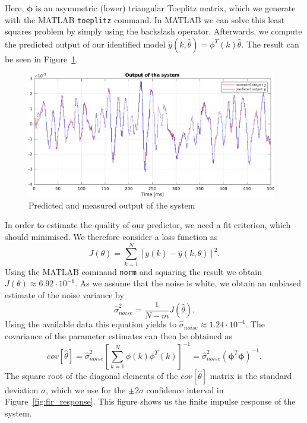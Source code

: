 Here, $\pmb{\phi}$ is an asymmetric (lower) triangular Toeplitz matrix, which we generate with the MATLAB \texttt{toeplitz} command.
In MATLAB we can solve this least squares problem by simply using the backslash operator. 
Afterwards, we compute the predicted output of our identified model $\hat{y} (k,\hat{\theta}) = \phi^{T} (k) \hat{\theta}$. The result can be seen in Figure~\ref{fig:output_fir}.
\begin{figure}[h]
	\centering
	\includegraphics[height=5.5cm]{figures/output.pdf}
	\caption{Predicted and measured output of the system}\label{fig:output_fir}
\end{figure}
In order to estimate the quality of our predictor, we need a fit criterion, which should minimised. We therefore consider a loss function as 
\begin{equation}\label{eq:J}
	J(\theta) = \sum\limits_{k=1}^N \left[y(k) - \hat{y}(k,\theta) \right]^2.
\end{equation}
Using the MATLAB command \texttt{norm} and squaring the result we obtain $ J(\theta) \approx 6.92 \cdot 10^{-6}$. 
As we assume that the noise is white, we obtain an unbiased estimate of the noise variance by
\begin{equation}\label{eq:sigma}
	\hat{\sigma}_{noise}^{2} = \frac{1}{N-m} J(\hat{\theta}) .
\end{equation}
Using the available data this equation yields to $ \hat{\sigma}_{noise} \approx 1.24 \cdot 10^{-4} $.
The covariance of the parameter estimates can then be obtained as
\begin{equation}\label{eq:cov}
	cov[\hat{\theta}] = \hat{\sigma}_{noise}^2 \left[ \sum\limits_{k=1}^N \phi(k)\phi^T(k) \right]^{-1} = \hat{\sigma}_{noise}^2 \left( \pmb{\phi}^T \pmb{\phi} \right)^{-1} .
\end{equation}
The square root of the diagonal elements of the $cov[\hat{\theta}]$ matrix is the standard deviation $ \sigma $, which we use for the $ \pm 2 \sigma $ confidence interval in Figure~\ref{fig:fir_response}. This figure shows us the finite impulse response of the system.
